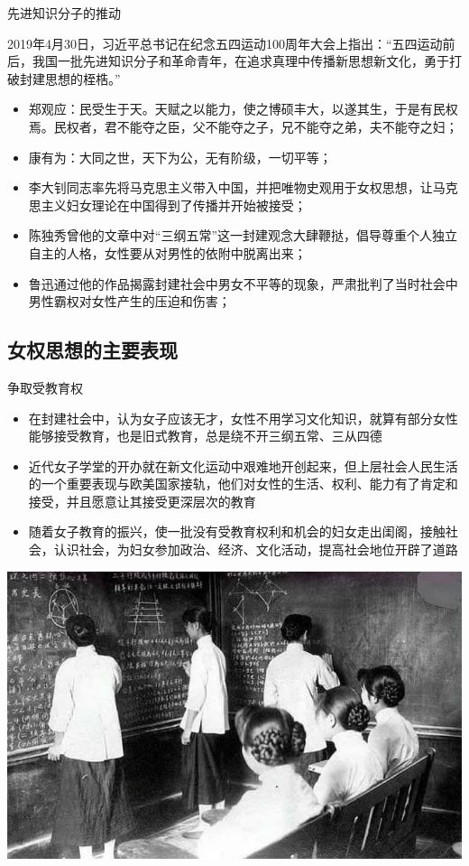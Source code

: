 \begin{frame}{先进知识分子的推动}
    \begin{block}{}
        2019年4月30日，习近平总书记在纪念五四运动100周年大会上指出：“五四运动前后，我国一批先进知识分子和革命青年，在追求真理中传播新思想新文化，勇于打破封建思想的桎梏。”
    \end{block}
    \begin{block}{}
        \begin{itemize}
            \item 郑观应：民受生于天。天赋之以能力，使之博硕丰大，以遂其生，于是有民权焉。民权者，君不能夺之臣，父不能夺之子，兄不能夺之弟，夫不能夺之妇；
            \item 康有为：大同之世，天下为公，无有阶级，一切平等；
            \item 李大钊同志率先将马克思主义带入中国，并把唯物史观用于女权思想，让马克思主义妇女理论在中国得到了传播并开始被接受；
            \item 陈独秀曾他的文章中对“三纲五常”这一封建观念大肆鞭挞，倡导尊重个人独立自主的人格，女性要从对男性的依附中脱离出来；
            \item 鲁迅通过他的作品揭露封建社会中男女不平等的现象，严肃批判了当时社会中男性霸权对女性产生的压迫和伤害；
        \end{itemize}
    \end{block}
\end{frame}



\subsection{女权思想的主要表现}
\begin{frame}{争取受教育权}
    \begin{block}{}
        \begin{itemize}
            \item 在封建社会中，认为女子应该无才，女性不用学习文化知识，就算有部分女性能够接受教育，也是旧式教育，总是绕不开三纲五常、三从四德
            \item 近代女子学堂的开办就在新文化运动中艰难地开创起来，但上层社会人民生活的一个重要表现与欧美国家接轨，他们对女性的生活、权利、能力有了肯定和接受，并且愿意让其接受更深层次的教育
            \item 随着女子教育的振兴，使一批没有受教育权利和机会的妇女走出闺阁，接触社会，认识社会，为妇女参加政治、经济、文化活动，提高社会地位开辟了道路
        \end{itemize}
    \end{block}
    \begin{center}
        \includegraphics[width=.35\textwidth]{../docs/img/1-6.jpg}
    \end{center}
\end{frame}

